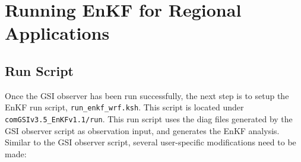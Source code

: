 \section{Running EnKF for Regional Applications}

\subsection{Run Script}

Once the GSI observer has been run successfully, the next step is to setup the EnKF run script, \verb|run_enkf_wrf.ksh|. This script is located under \verb|comGSIv3.5_EnKFv1.1/run|. This run script uses the diag files generated by the GSI observer script as observation input, and generates the EnKF analysis. Similar to the GSI observer script, several user-specific modifications need to be made:

